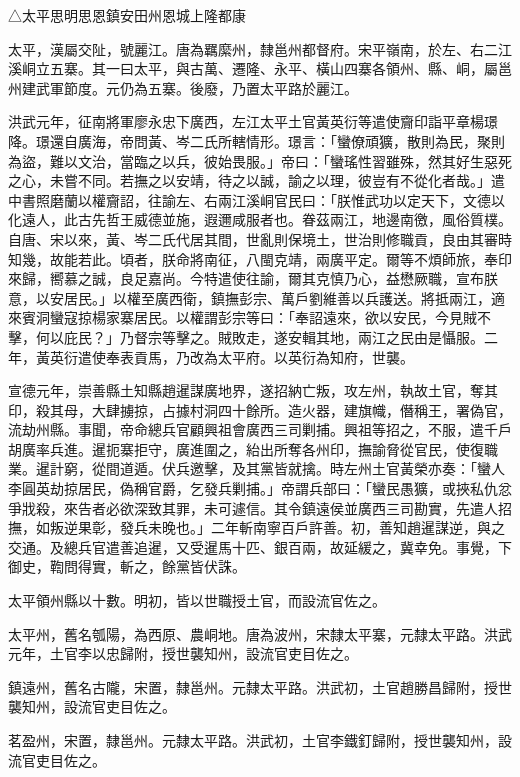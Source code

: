 
\begin{pinyinscope}
△太平思明思恩鎮安田州恩城上隆都康

太平，漢屬交阯，號麗江。唐為羈縻州，隸邕州都督府。宋平嶺南，於左、右二江溪峒立五寨。其一曰太平，與古萬、遷隆、永平、橫山四寨各領州、縣、峒，屬邕州建武軍節度。元仍為五寨。後廢，乃置太平路於麗江。

洪武元年，征南將軍廖永忠下廣西，左江太平土官黃英衍等遣使齎印詣平章楊璟降。璟還自廣海，帝問黃、岑二氏所轄情形。璟言：「蠻僚頑獷，散則為民，聚則為盜，難以文治，當臨之以兵，彼始畏服。」帝曰：「蠻瑤性習雖殊，然其好生惡死之心，未嘗不同。若撫之以安靖，待之以誠，諭之以理，彼豈有不從化者哉。」遣中書照磨蘭以權齎詔，往諭左、右兩江溪峒官民曰：「朕惟武功以定天下，文德以化遠人，此古先哲王威德並施，遐邇咸服者也。眷茲兩江，地邊南徼，風俗質樸。自唐、宋以來，黃、岑二氏代居其間，世亂則保境土，世治則修職貢，良由其審時知幾，故能若此。頃者，朕命將南征，八閩克靖，兩廣平定。爾等不煩師旅，奉印來歸，嚮慕之誠，良足嘉尚。今特遣使往諭，爾其克慎乃心，益懋厥職，宣布朕意，以安居民。」以權至廣西衛，鎮撫彭宗、萬戶劉維善以兵護送。將抵兩江，適來賓洞蠻寇掠楊家寨居民。以權謂彭宗等曰：「奉詔遠來，欲以安民，今見賊不擊，何以庇民？」乃督宗等擊之。賊敗走，遂安輯其地，兩江之民由是懾服。二年，黃英衍遣使奉表貢馬，乃改為太平府。以英衍為知府，世襲。

宣德元年，崇善縣土知縣趙暹謀廣地界，遂招納亡叛，攻左州，執故土官，奪其印，殺其母，大肆擄掠，占據村洞四十餘所。造火器，建旗幟，僭稱王，署偽官，流劫州縣。事聞，帝命總兵官顧興祖會廣西三司剿捕。興祖等招之，不服，遣千戶胡廣率兵進。暹扼寨拒守，廣進圍之，紿出所奪各州印，撫諭脅從官民，使復職業。暹計窮，從間道遁。伏兵邀擊，及其黨皆就擒。時左州土官黃榮亦奏：「蠻人李圓英劫掠居民，偽稱官爵，乞發兵剿捕。」帝謂兵部曰：「蠻民愚獷，或挾私仇忿爭戕殺，來告者必欲深致其罪，未可遽信。其令鎮遠侯並廣西三司勘實，先遣人招撫，如叛逆果彰，發兵未晚也。」二年斬南寧百戶許善。初，善知趙暹謀逆，與之交通。及總兵官遣善追暹，又受暹馬十匹、銀百兩，故延緩之，冀幸免。事覺，下御史，鞫問得實，斬之，餘黨皆伏誅。

太平領州縣以十數。明初，皆以世職授土官，而設流官佐之。

太平州，舊名瓠陽，為西原、農峒地。唐為波州，宋隸太平寨，元隸太平路。洪武元年，土官李以忠歸附，授世襲知州，設流官吏目佐之。

鎮遠州，舊名古隴，宋置，隸邕州。元隸太平路。洪武初，土官趙勝昌歸附，授世襲知州，設流官吏目佐之。

茗盈州，宋置，隸邕州。元隸太平路。洪武初，土官李鐵釘歸附，授世襲知州，設流官吏目佐之。


\end{pinyinscope}
